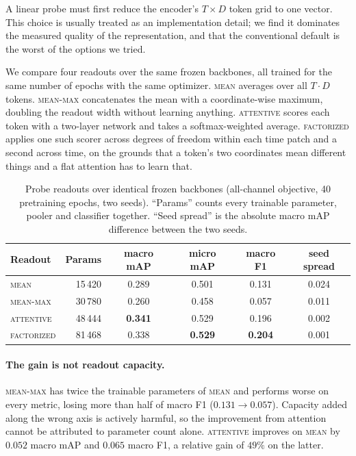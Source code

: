 A linear probe must first reduce the encoder's $T \times D$ token grid to one vector.
This choice is usually treated as an implementation detail; we find it dominates the
measured quality of the representation, and that the conventional default is the worst
of the options we tried.

We compare four readouts over the same frozen backbones, all trained for the same
number of epochs with the same optimizer. \textsc{mean} averages over all $T \cdot D$
tokens. \textsc{mean-max} concatenates the mean with a coordinate-wise maximum,
doubling the readout width without learning anything. \textsc{attentive} scores each
token with a two-layer network and takes a softmax-weighted average. \textsc{factorized}
applies one such scorer across degrees of freedom within each time patch and a second
across time, on the grounds that a token's two coordinates mean different things and a
flat attention has to learn that.

\begin{table}[t]
\centering
\small
\begin{tabular}{lrcccc}
\toprule
Readout & Params & macro mAP & micro mAP & macro F1 & seed spread \\
\midrule
\textsc{mean}        & 15\,420 & 0.289 & 0.501 & 0.131 & 0.024 \\
\textsc{mean-max}    & 30\,780 & 0.260 & 0.458 & 0.057 & 0.011 \\
\textsc{attentive}   & 48\,444 & \textbf{0.341} & 0.529 & 0.196 & 0.002 \\
\textsc{factorized}  & 81\,468 & 0.338 & \textbf{0.529} & \textbf{0.204} & 0.001 \\
\bottomrule
\end{tabular}
\caption{Probe readouts over identical frozen backbones (all-channel objective, 40
pretraining epochs, two seeds). ``Params'' counts every trainable parameter, pooler and
classifier together. ``Seed spread'' is the absolute macro mAP difference between the
two seeds.}
\label{tab:pooling}
\end{table}

\paragraph{The gain is not readout capacity.} \textsc{mean-max} has twice the trainable
parameters of \textsc{mean} and performs worse on every metric, losing more than half of
macro F1 ($0.131 \rightarrow 0.057$). Capacity added along the wrong axis is actively
harmful, so the improvement from attention cannot be attributed to parameter count
alone. \textsc{attentive} improves on \textsc{mean} by $0.052$ macro mAP and $0.065$
macro F1, a relative gain of $49\%$ on the latter.

